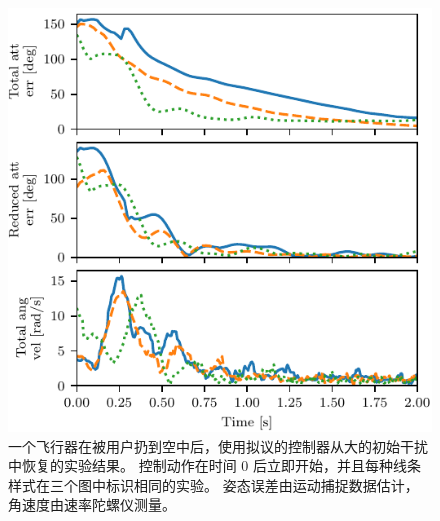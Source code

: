 \begin{figure}
  \centering
  \includegraphics{Figures/Experiments/LargeDisturbances/fig_hists.pdf}
  \caption{
  一个飞行器在被用户扔到空中后，使用拟议的控制器从大的初始干扰中恢复的实验结果。 
  控制动作在时间 0 后立即开始，并且每种线条样式在三个图中标识相同的实验。
  姿态误差由运动捕捉数据估计，角速度由速率陀螺仪测量。
  }
  \label{figExpLargeDisturbance}
\end{figure}
